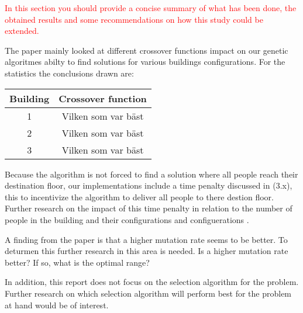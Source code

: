 \textcolor{red}{In this section you should provide a concise summary of what has been done, the obtained results and some recommendations on how this study could be extended.}

The paper mainly looked at different crossover functions impact on our genetic algoritmes abilty to find solutions for various buildings configurations. For the statistics the conclusions drawn are: 

\begin{center}
\begin{tabular}{|c|c|}
	\hline
	Building & Crossover function \\ \hline
	1 & Vilken som var bäst \\ \hline
	2 & Vilken som var bäst \\ \hline
	3 & Vilken som var bäst \\ \hline
\end{tabular}
\end{center}
Because the algorithm is not forced to find a solution where all people reach their destination floor, our implementations include a time penalty discussed in (3.x), this to incentivize the algorithm to deliver all people to there destion floor. Further research on the impact of this time penalty in relation to the number of people in the building and their configurations and configuerations .

A finding from the paper is that a higher mutation rate seems to be better. To deturmen this further research in this area is needed. Is a higher mutation rate better? If so, what is the optimal range?

In addition, this report does not focus on the selection algorithm for the problem. Further research on which selection algorithm will perform best for the problem at hand would be of interest.
\lipsum[4]
